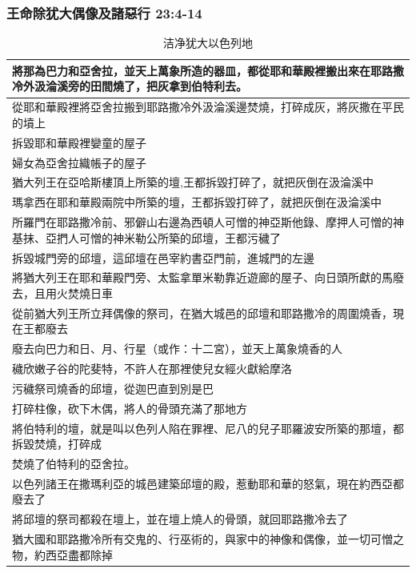 \subsubsection{王命除犹大偶像及諸惡行 23:4-14}
\begin{table}[!hbp]
\centering
\begin{tabular}{|p{14cm}|}
\hline
\hline
 將那為巴力和亞舍拉，並天上萬象所造的器皿，都從耶和華殿裡搬出來在耶路撒冷外汲淪溪旁的田間燒了，把灰拿到伯特利去。  \\\hline
 從耶和華殿裡將亞舍拉搬到耶路撒冷外汲淪溪邊焚燒，打碎成灰，將灰撒在平民的墳上 \\\hline
 拆毀耶和華殿裡孌童的屋子  \\\hline
婦女為亞舍拉織帳子的屋子 \\\hline
猶大列王在亞哈斯樓頂上所築的壇,王都拆毀打碎了，就把灰倒在汲淪溪中 \\\hline
瑪拿西在耶和華殿兩院中所築的壇，王都拆毀打碎了，就把灰倒在汲淪溪中  \\\hline
所羅門在耶路撒冷前、邪僻山右邊為西頓人可憎的神亞斯他錄、摩押人可憎的神基抹、亞捫人可憎的神米勒公所築的邱壇，王都污穢了 \\\hline
拆毀城門旁的邱壇，這邱壇在邑宰約書亞門前，進城門的左邊 \\\hline
將猶大列王在耶和華殿門旁、太監拿單米勒靠近遊廊的屋子、向日頭所獻的馬廢去，且用火焚燒日車 \\\hline
從前猶大列王所立拜偶像的祭司，在猶大城邑的邱壇和耶路撒冷的周圍燒香，現在王都廢去  \\\hline
廢去向巴力和日、月、行星（或作：十二宮），並天上萬象燒香的人 \\\hline
穢欣嫩子谷的陀斐特，不許人在那裡使兒女經火獻給摩洛 \\\hline
污穢祭司燒香的邱壇，從迦巴直到別是巴 \\\hline
打碎柱像，砍下木偶，將人的骨頭充滿了那地方 \\\hline
將伯特利的壇，就是叫以色列人陷在罪裡、尼八的兒子耶羅波安所築的那壇，都拆毀焚燒，打碎成\\\hline
焚燒了伯特利的亞舍拉。\\\hline
以色列諸王在撒瑪利亞的城邑建築邱壇的殿，惹動耶和華的怒氣，現在約西亞都廢去了\\\hline
將邱壇的祭司都殺在壇上，並在壇上燒人的骨頭，就回耶路撒冷去了\\\hline
猶大國和耶路撒冷所有交鬼的、行巫術的，與家中的神像和偶像，並一切可憎之物，約西亞盡都除掉\\\hline
\end{tabular}
\caption{洁净犹大以色列地}
\end{table}
